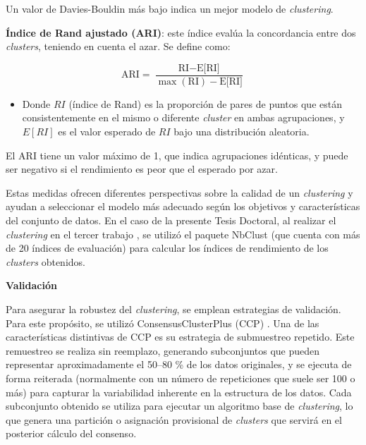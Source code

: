 Un valor de Davies-Bouldin más bajo indica un mejor modelo de \textit{clustering}.


\textbf{Índice de Rand ajustado (ARI)}: este índice evalúa la concordancia entre dos \textit{clusters}, teniendo en cuenta el azar. Se define como:

\begin{equation}
    \text{ARI} = \frac{\text{RI} - \text{E[RI]}}{\max(\text{RI}) - \text{E[RI]}}
\end{equation}
\begin{itemize}
\item Donde $RI$ (índice de Rand) es la proporción de pares de puntos que están consistentemente en el mismo o diferente \textit{cluster} en ambas agrupaciones, y $E[RI]$ es el valor esperado de $RI$ bajo una distribución aleatoria.
\end{itemize}
El ARI tiene un valor máximo de 1, que indica agrupaciones idénticas, y puede ser negativo si el rendimiento es peor que el esperado por azar.

Estas medidas ofrecen diferentes perspectivas sobre la calidad de un \textit{clustering} y ayudan a seleccionar el modelo más adecuado según los objetivos y características del conjunto de datos. En el caso de la presente Tesis Doctoral, al realizar el \textit{clustering} en el tercer trabajo \cite{paper3}, se utilizó el paquete NbClust \cite{charrad2014nbclust} (que cuenta con más de 20 índices de evaluación) para calcular los índices de rendimiento de los \textit{clusters} obtenidos.

\textbf{Validación}

Para asegurar la robustez del \textit{clustering}, se emplean estrategias de validación. Para este propósito, se utilizó ConsensusClusterPlus (CCP) \cite{wilkerson2010consensusclusterplus}. Una de las características distintivas de CCP es su estrategia de submuestreo repetido. Este remuestreo se realiza sin reemplazo, generando subconjuntos que pueden representar aproximadamente el 50–80 \% de los datos originales, y se ejecuta de forma reiterada (normalmente con un número de repeticiones que suele ser 100 o más) para capturar la variabilidad inherente en la estructura de los datos. Cada subconjunto obtenido se utiliza para ejecutar un algoritmo base de \textit{clustering}, lo que genera una partición o asignación provisional de \textit{clusters} que servirá en el posterior cálculo del consenso.

